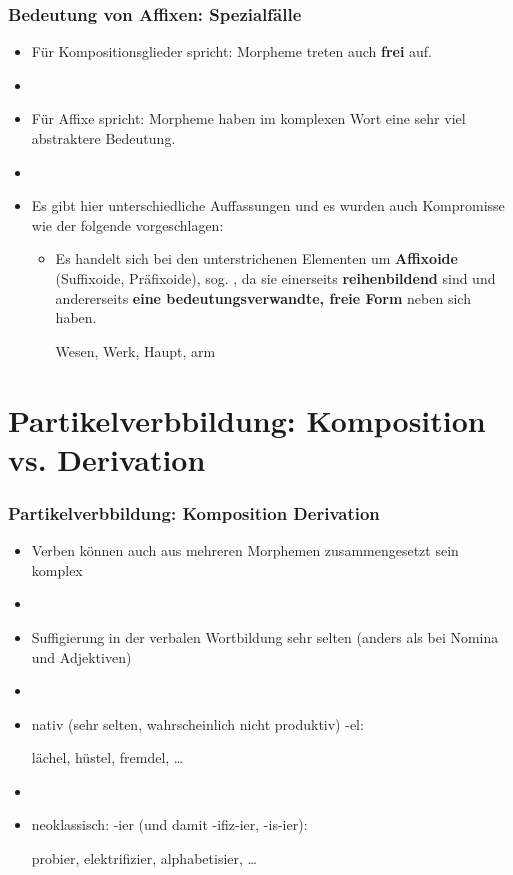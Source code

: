 \begin{frame}
\frametitle{Bedeutung von Affixen: Spezialfälle}

\begin{itemize}
	\item Für Kompositionsglieder spricht: Morpheme treten auch \textbf{frei} auf.
	\item[]
	\item Für Affixe spricht: Morpheme haben im komplexen Wort eine sehr viel abstraktere Bedeutung.
	\item[]
	\item Es gibt hier unterschiedliche Auffassungen und es wurden auch Kompromisse wie der folgende vorgeschlagen:
	
	\begin{itemize}
		\item Es handelt sich bei den unterstrichenen Elementen um \textbf{Affixoide} (Suffixoide, Präfixoide), sog. , da sie einerseits \textbf{reihenbildend} sind und andererseits \textbf{eine bedeutungsverwandte, freie Form} neben sich haben.
		
		\ea Wesen, Werk, Haupt, arm
		\z
		
	\end{itemize}
	
\end{itemize}


\end{frame}


\section{Partikelverbbildung: Komposition vs. Derivation}



\begin{frame}
\frametitle{Partikelverbbildung: Komposition \vs Derivation}

\begin{itemize}
	\item Verben können auch aus mehreren Morphemen zusammengesetzt sein \ras komplex 
	\item[]
	\item Suffigierung in der verbalen Wortbildung \ras sehr selten (anders als bei Nomina und Adjektiven)
	\item[]
	\item nativ (sehr selten, wahrscheinlich nicht produktiv) -el:
	
	\ea lächel, hüstel, fremdel, \dots
	\z

	\item[]
	\item neoklassisch: -ier (und damit -ifiz-ier, -is-ier):
	
	\ea probier, elektrifizier, alphabetisier, \dots 
	\z
	
\end{itemize}

\end{frame}



